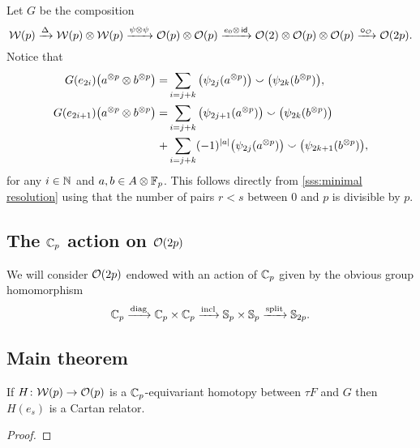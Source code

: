 \sssec

Let $G$ be the composition
\[
\mathcal{W}(p) \xrightarrow{\Delta}
\mathcal{W}(p) \otimes \mathcal{W}(p) \xrightarrow{\psi \otimes \psi}
\mathcal{O}(p) \otimes \mathcal{O}(p) \xrightarrow{e_0 \otimes\, \mathsf{id}}
\mathcal{O}(2) \otimes \mathcal{O}(p) \otimes \mathcal{O}(p) \xrightarrow{\bm{\circ}_{\mathcal{O}}}
\mathcal{O}(2p).
\]
Notice that
\begin{equation*}
	\begin{split}
		G(e_{2i})\big(a^{\otimes p} \otimes b^{\otimes p}\big) =&
		\sum_{i=j+k}\big(\psi_{2j}(a^{\otimes p})\big) \smallsmile \big(\psi_{2k}(b^{\otimes p})\big), \\
		G(e_{2i+1})\big(a^{\otimes p} \otimes b^{\otimes p}\big) =&
		\sum_{i=j+k} \big(\psi_{2j+1}(a^{\otimes p})\big) \smallsmile \big(\psi_{2k}(b^{\otimes p})\big) \\ \ +&
		\sum_{i=j+k} (-1)^{\lvert a\rvert} \big(\psi_{2j}(a^{\otimes p})\big) \smallsmile \big(\psi_{2k+1}(b^{\otimes p})\big),
	\end{split}
\end{equation*}
for any $i \in \mathbb{N}$ and $a,b \in A \otimes {\mathbb{F}_p}$.
This follows directly from \cref{sss:minimal resolution} using that the number of pairs $r<s$ between $0$ and $p$ is divisible by $p$.

\subsection{The $\mathbb{C}_p$ action on $\mathcal{O}(2p)$}\label{ss:cyclic action}

We will consider $\mathcal{O}(2p)$ endowed with an action of $\mathbb{C}_p$ given by the obvious group homomorphism
\[
\mathbb{C}_p \xrightarrow{\mathrm{diag}} \mathbb{C}_p \times \mathbb{C}_p \xrightarrow{\mathrm{incl}} \mathbb{S}_p \times \mathbb{S}_p \xrightarrow{\mathrm{split}} \mathbb{S}_{2p}.
\]

\subsection{Main theorem}

If $H \colon \mathcal{W}(p) \to \mathcal{O}(p)$ is a $\mathbb{C}_p$-equivariant homotopy between $\tau F$ and $G$ then
$H(e_s)$ is a Cartan relator.

\begin{proof}
	\TBW
\end{proof}